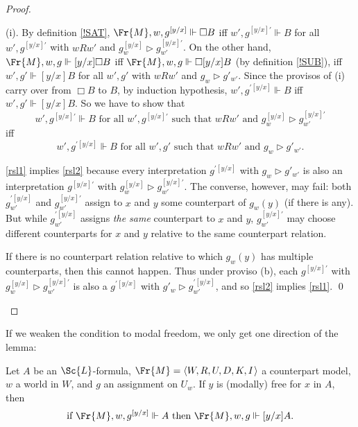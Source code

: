 \documentclass[11pt]{woarticle}
\theoremstyle{break}
\theoremstyle{nonumberplain}
\newcommand{\SAT}{\Vdash}
\newcommand{\Img}{\triangleright}
\newcommand{\1}{\;\,|\;\,}
\renewcommand{\t}[1]{\ensuremath{\langle #1  \makebox[.2ex]{}\rangle}}
\begin{document}
\begin{proof}
\begin{enumerate}
          
    (i). By definition \ref{!SAT}, $\Fr{M},w,g^{[y/x]} \SAT \Box B$ iff
    $w',g^{[y/x]\prime} \SAT B$ for all $w',g^{[y/x]\prime}$ with
    $wRw'$ and $g^{[y/x]}_w \Img g^{[y/x]\prime}_{w'}$. On the other hand,
    $\Fr{M},w,g \SAT [y/x]\Box B$ iff $\Fr{M},w,g \SAT \Box [y/x]B$ (by definition
    \ref{!SUB}), iff $w',g' \SAT [y/x]B$ for all $w',g'$ with $wRw'$
    and $g_w \Img g'_{w'}$. Since the provisos of (i) carry over from
    $\Box B$ to $B$, by induction hypothesis, $w',g^{\prime [y/x]}
    \SAT B$ iff $w',g' \SAT [y/x]B$. So we have to show that
    \begin{equation}\tag{1}\label{rsl1}
      w',g^{[y/x]\prime} \SAT B \text{ for all $w',g^{[y/x]\prime}$ such that
        $wRw'$ and $g^{[y/x]}_w \Img g^{[y/x]\prime}_{w'}$}
    \end{equation}
    iff
    \begin{equation}\tag{2}\label{rsl2}
      w',g^{\prime[y/x]} \SAT B \text{ for all $w',g'$ such that $wRw'$ and
        $g_w \Img g'_{w'}$.}
    \end{equation}
    
    \eqref{rsl1} implies \eqref{rsl2} because every interpretation
    $g^{\prime[y/x]}$ with $g_w \Img g'_{w'}$ is also an
    interpretation $g^{[y/x]\prime}$ with $g^{[y/x]}_w \Img
    g^{[y/x]\prime}_{w'}$. The converse, however, may fail: both
    $g^{\prime[y/x]}_{w'}$ and $g^{[y/x]\prime}_{w'}$ assign to $x$
    and $y$ some counterpart of $g_w(y)$ (if there is any). But while
    $g^{\prime[y/x]}_{w'}$ assigns \emph{the same} counterpart to $x$
    and $y$, $g^{[y/x]\prime}_{w'}$ may choose different counterparts
    for $x$ and $y$ relative to the same counterpart relation.

    If there is no counterpart relation relative to which $g_w(y)$ has
    multiple counterparts, then this cannot happen. Thus under proviso
    (b), each $g^{[y/x]\prime}$ with $g^{[y/x]}_w \Img
    g^{[y/x]\prime}_{w'}$ is also a $g^{\prime[y/x]}$ with $g'_w \Img
    g^{\prime[y/x]}_{w'}$, and so \eqref{rsl2} implies \eqref{rsl1}. \qed

  \end{enumerate}
\end{proof}

If we weaken the condition to modal freedom, we only get one direction of the
lemma:

\begin{lemma}\label{rsl}
  Let $A$ be an $\Sc{L}$-formula, $\Fr{M} = \t{W,R,U,D,K,I}$ a counterpart
  model, $w$ a world in $W$, and $g$ an assignment on $U_{w}$. If $y$ is (modally)
  free for $x$ in $A$, then
  \[
    \text{if } \Fr{M},w,g^{[y/x]} \SAT A \text{ then }\Fr{M},w,g \SAT [y/x]A.
  \]
\end{lemma}
\end{document}
